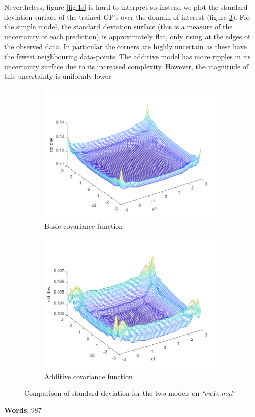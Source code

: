 \documentclass[]{article}
\begin{document}
Nevertheless, figure \ref{fig:1e} is hard to interpret so instead we plot the standard deviation surface of the trained GP's over the domain of interest (figure \ref{fig:std-dev}). For the simple model, the standard deviation surface (this is a measure of the uncertainty of each prediction) is approximately flat, only rising at the edges of the observed data. In particular the corners are highly uncertain as these have the fewest neighbouring data-points. The additive model has more ripples in its uncertainty surface due to its increased complexity. However, the magnitude of this uncertainty is uniformly lower.

\begin{figure}[!h]
	\begin{subfigure}{0.5\linewidth}
		\centering
		\includegraphics[width=\linewidth]{1e1b}
		\caption{Basic covariance function}
		\label{fig:1e1b}
	\end{subfigure}
	\begin{subfigure}{0.5\linewidth}
		\centering
		\includegraphics[width=\linewidth]{1e2b}
		\caption{Additive covariance function}
		\label{fig:1e2b}
	\end{subfigure}
	\caption{Comparison of standard deviation for the two models on \textit{`cw1e.mat'}}
	\label{fig:std-dev}
\end{figure}

\textbf{Words}: 987
\end{document}
